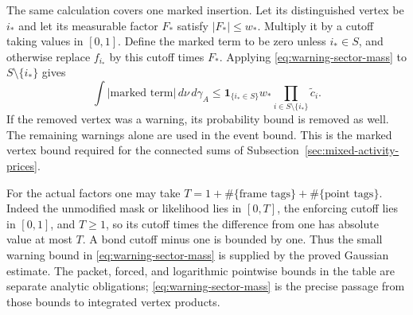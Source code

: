 The same calculation covers one marked insertion. Let its distinguished
vertex be $i_*$ and let its measurable factor $F_*$ satisfy
$|F_*|\le w_*$. Multiply it by a cutoff taking values in $[0,1]$.
Define the marked term to be zero unless $i_*\in S$, and otherwise
replace $f_{i_*}$ by this cutoff times $F_*$. Applying
\eqref{eq:warning-sector-mass} to $S\setminus\{i_*\}$ gives
\begin{equation}\label{eq:warning-marked-mass}
 \int |\text{marked term}|\,d\nu\,d\gamma_A
 \le \mathbf1_{\{i_*\in S\}}w_*
       \prod_{i\in S\setminus\{i_*\}}\widetilde c_i.
\end{equation}
If the removed vertex was a warning, its probability bound is removed
as well. The remaining warnings alone are used in the event bound.
This is the marked vertex bound required for the connected sums of
Subsection~\ref{sec:mixed-activity-prices}.

For the actual factors one may take
$T=1+\#\{\text{frame tags}\}+\#\{\text{point tags}\}$.
Indeed the unmodified mask or likelihood lies in $[0,T]$, the enforcing
cutoff lies in $[0,1]$, and $T\ge1$, so its cutoff times the difference
from one has absolute value at most $T$. A bond cutoff minus one is
bounded by one. Thus the small warning bound in
\eqref{eq:warning-sector-mass} is supplied by the proved Gaussian
estimate. The packet, forced, and logarithmic pointwise bounds in the
table are separate analytic obligations; \eqref{eq:warning-sector-mass}
is the precise passage from those bounds to integrated vertex products.

